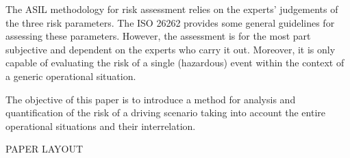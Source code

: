 The ASIL methodology for risk assessment relies on the experts’ judgements of the three risk parameters. The ISO 26262 provides some general guidelines for assessing these parameters. However, the assessment is for the most part subjective and dependent on the experts who carry it out. Moreover, it is only capable of evaluating the risk of a single (hazardous) event within the context of a generic operational situation.

The objective of this paper is to introduce a method for analysis and quantification of the risk of a driving scenario taking into account the entire operational situations and their interrelation.

PAPER LAYOUT